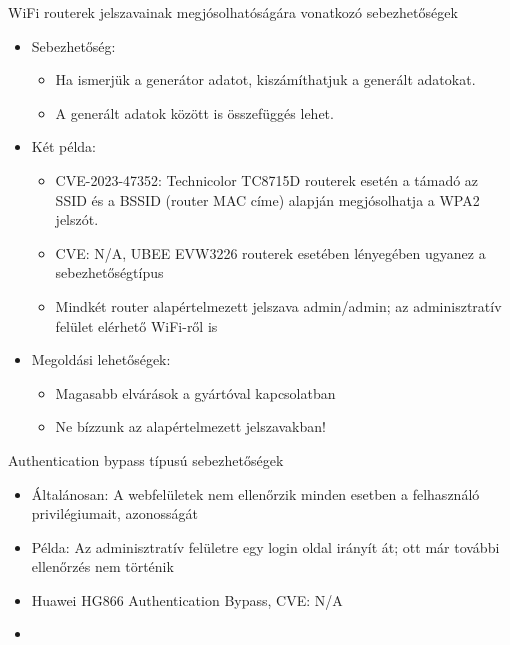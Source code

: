 \documentclass[12 pt]{beamer}
\begin{document}
\begin{frame}{WiFi routerek jelszavainak megjósolhatóságára vonatkozó sebezhetőségek}
  \begin{itemize}
    \item{Sebezhetőség:}
      \begin{itemize}
        \item{Ha ismerjük a generátor adatot, kiszámíthatjuk a generált adatokat.}
        \item{A generált adatok között is összefüggés lehet.}
      \end{itemize}
    \item{Két példa:}
  \begin{itemize}
    \item{CVE-2023-47352: Technicolor TC8715D routerek esetén a támadó az SSID és a BSSID (router MAC címe) alapján megjósolhatja a WPA2 jelszót.}
    \item{CVE: N/A, UBEE EVW3226 routerek esetében lényegében ugyanez a sebezhetőségtípus}
    \item{Mindkét router alapértelmezett jelszava admin/admin; az adminisztratív felület elérhető WiFi-ről is}
  \end{itemize}
\item{Megoldási lehetőségek:}
  \begin{itemize}
    \item{Magasabb elvárások a gyártóval kapcsolatban}
    \item{Ne bízzunk az alapértelmezett jelszavakban!}
  \end{itemize}
  \end{itemize}
\end{frame}

\begin{frame}{Authentication bypass típusú sebezhetőségek}
  \begin{itemize}
    \item{Általánosan: A webfelületek nem ellenőrzik minden esetben a felhasználó privilégiumait, azonosságát}
    \item{Példa: Az adminisztratív felületre egy login oldal irányít át; ott már további ellenőrzés nem történik}
    \item{Huawei HG866 Authentication Bypass, CVE: N/A}
    \item{}
  \end{itemize}
\end{frame}
\end{document}
